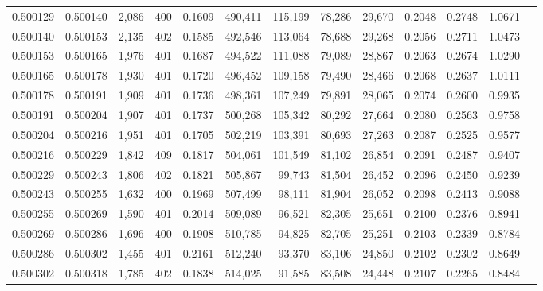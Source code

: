 \begin{tabular}{rrrrrrrrrrrrr}
0.500129 & 0.500140 & 2,086 & 400 &                                     0.1609 & 490,411 & 115,199 &  78,286 &  29,670 & 0.2048 & 0.2748 & 1.0671 \\
0.500140 & 0.500153 & 2,135 & 402 &                                     0.1585 & 492,546 & 113,064 &  78,688 &  29,268 & 0.2056 & 0.2711 & 1.0473 \\
0.500153 & 0.500165 & 1,976 & 401 &                                     0.1687 & 494,522 & 111,088 &  79,089 &  28,867 & 0.2063 & 0.2674 & 1.0290 \\
0.500165 & 0.500178 & 1,930 & 401 &                                     0.1720 & 496,452 & 109,158 &  79,490 &  28,466 & 0.2068 & 0.2637 & 1.0111 \\
0.500178 & 0.500191 & 1,909 & 401 &                                     0.1736 & 498,361 & 107,249 &  79,891 &  28,065 & 0.2074 & 0.2600 & 0.9935 \\
0.500191 & 0.500204 & 1,907 & 401 &                                     0.1737 & 500,268 & 105,342 &  80,292 &  27,664 & 0.2080 & 0.2563 & 0.9758 \\
0.500204 & 0.500216 & 1,951 & 401 &                                     0.1705 & 502,219 & 103,391 &  80,693 &  27,263 & 0.2087 & 0.2525 & 0.9577 \\
0.500216 & 0.500229 & 1,842 & 409 &                                     0.1817 & 504,061 & 101,549 &  81,102 &  26,854 & 0.2091 & 0.2487 & 0.9407 \\
0.500229 & 0.500243 & 1,806 & 402 &                                     0.1821 & 505,867 &  99,743 &  81,504 &  26,452 & 0.2096 & 0.2450 & 0.9239 \\
0.500243 & 0.500255 & 1,632 & 400 &                                     0.1969 & 507,499 &  98,111 &  81,904 &  26,052 & 0.2098 & 0.2413 & 0.9088 \\
0.500255 & 0.500269 & 1,590 & 401 &                                     0.2014 & 509,089 &  96,521 &  82,305 &  25,651 & 0.2100 & 0.2376 & 0.8941 \\
0.500269 & 0.500286 & 1,696 & 400 &                                     0.1908 & 510,785 &  94,825 &  82,705 &  25,251 & 0.2103 & 0.2339 & 0.8784 \\
0.500286 & 0.500302 & 1,455 & 401 &                                     0.2161 & 512,240 &  93,370 &  83,106 &  24,850 & 0.2102 & 0.2302 & 0.8649 \\
0.500302 & 0.500318 & 1,785 & 402 &                                     0.1838 & 514,025 &  91,585 &  83,508 &  24,448 & 0.2107 & 0.2265 & 0.8484 \\

\end{tabular}
